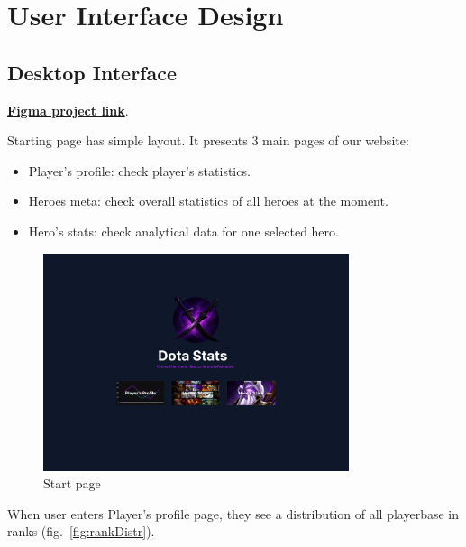 \section{User Interface Design}

    \subsection{Desktop Interface}

    \href{https://www.figma.com/design/ZMtwuBt3jj4DOkPbbY6ElO/dota-stats?node-id=0-1&t=I0Mi3I4WJnfS4DOc-1}{\textbf{Figma project link}}.

    \vspace{1em}
    Starting page has simple layout.
    It presents 3 main pages of our website:
    \begin{itemize}
        \item Player's profile: check player's statistics.
        \item Heroes meta: check overall statistics of all heroes at the moment.
        \item Hero's stats: check analytical data for one selected hero.
    \end{itemize}


    \begin{figure}[ht]
        \centering
        \includegraphics[width=0.8\textwidth]{images/Start}
        \caption{Start page}
    \end{figure}

    When user enters Player's profile page, they see a distribution of all playerbase in ranks (fig.~\ref{fig:rankDistr}).

